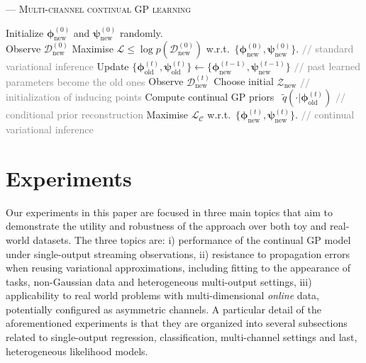 \documentclass[]{article}
\newcommand{\Zcal}{\mathcal{Z}}
\newcommand{\Dcal}{\mathcal{D}}
\newcommand{\Lcal}{\mathcal{L}}
\begin{document}
\begin{algorithm}[]
	\caption{--- \textsc{Multi-channel continual GP learning}}
	\label{alg:multi}
	\begin{algorithmic}[1]
		\STATE Initialize $\bm{\phi}_\text{new}^{(0)}$ and $\bm{\psi}_\text{new}^{(0)}$ randomly.\\
		 Observe $\Dcal^{(0)}_\text{new}$ 
		\STATE	Maximise $\Lcal\leq\log p(\Dcal^{(0)}_\text{new})$ w.r.t.\ $\{\bm{\phi}_\text{new}^{(0)}, \bm{\psi}_\text{new}^{(0)}\}$. \hfill \textcolor{gray}{$//$ standard variational inference}
		\STATE	Update $\{\bm{\phi}_\text{old}^{(t)}, \bm{\psi}_\text{old}^{(t)}\} \leftarrow  \{\bm{\phi}_\text{new}^{(t-1)}, \bm{\psi}_\text{new}^{(t-1)}\}$ \hfill \textcolor{gray}{$//$ past learned parameters become the old ones}
		 Observe $\Dcal^{(t)}_\text{new}$ 
		\STATE Choose initial $\Zcal_\text{new}$ \hfill \textcolor{gray}{$//$ initialization of inducing points}
		\STATE Compute continual GP priors ~$\widetilde{q}(\cdot|\bm{\phi}_\text{old}^{(t)})$ \hfill \textcolor{gray}{$//$ conditional prior reconstruction}
		\ENDFOR
		\STATE	Maximise $\Lcal_\mathcal{C}$ w.r.t.\ $\{\bm{\phi}_\text{new}^{(t)}, \bm{\psi}_\text{new}^{(t)}\}$. \hfill  \textcolor{gray}{$//$ continual variational inference}
		\ENDFOR
	\end{algorithmic}
\end{algorithm}



\section{Experiments}
\label{sec:experiments}

Our experiments in this paper are focused in three main topics that aim to demonstrate the utility and robustness of the approach over both toy and real-world datasets. The three topics are: i) performance of the continual GP model under single-output streaming observations, ii) resistance to propagation errors when reusing variational approximations, including fitting to the appearance of tasks, non-Gaussian data and heterogeneous multi-output settings, iii) applicability to real world problems with multi-dimensional \textit{online} data, potentially configured as asymmetric channels. A particular detail of the aforementioned experiments is that they are organized into several subsections related to single-output regression, classification, multi-channel settings and last, heterogeneous likelihood models. 
\end{document}

